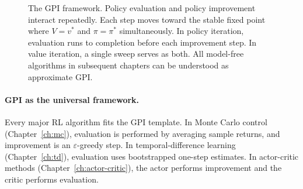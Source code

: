 \begin{figure}[ht]
\centering
{}
\caption{The GPI framework.  Policy evaluation and policy improvement interact repeatedly.  Each step moves toward the stable fixed point where $V = v^*$ and $\pi = \pi^*$ simultaneously.  In policy iteration, evaluation runs to completion before each improvement step.  In value iteration, a single sweep serves as both.  All model-free algorithms in subsequent chapters can be understood as approximate GPI.}
\label{fig:gpi}
\end{figure}

\paragraph{GPI as the universal framework.}
Every major RL algorithm fits the GPI template.  In Monte Carlo control (Chapter~\ref{ch:mc}), evaluation is performed by averaging sample returns, and improvement is an $\varepsilon$-greedy step.  In temporal-difference learning (Chapter~\ref{ch:td}), evaluation uses bootstrapped one-step estimates.  In actor-critic methods (Chapter~\ref{ch:actor-critic}), the actor performs improvement and the critic performs evaluation.

